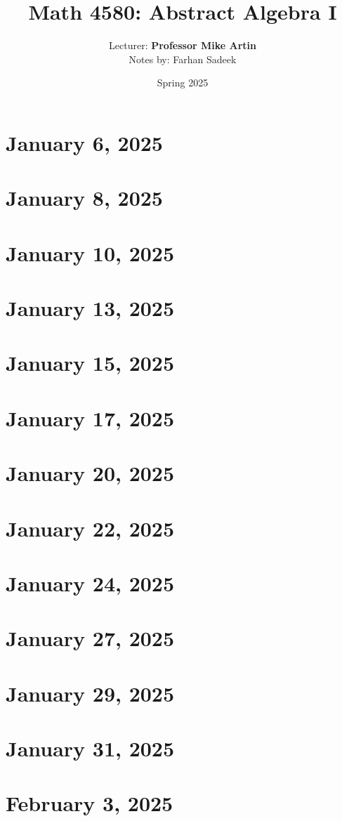 \documentclass[11pt]{article} \usepackage{lindrew}
\title{Math 4580: Abstract Algebra I} \author{Lecturer: \textbf{Professor Mike Artin}\\Notes by: Farhan Sadeek} \date{Spring 2025}
\begin{document}
\maketitle
\section{January 6, 2025}
\section{January 8, 2025}
\section{January 10, 2025}
\section{January 13, 2025}
\section{January 15, 2025}
\section{January 17, 2025}
\section{January 20, 2025}
\section{January 22, 2025}
\section{January 24, 2025}
\section{January 27, 2025}
\section{January 29, 2025}
\section{January 31, 2025}
\section{February 3, 2025}
\end{document}
